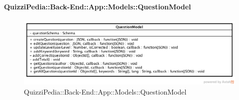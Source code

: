 \paragraph{QuizziPedia::Back-End::App::Models::QuestionModel}
\label{QuizziPedia::Back-End::App::Models::QuestionModel}
\begin{figure}[ht]
	\centering
	\includegraphics[scale=0.65]{UML/Classi/Back-End/QuizziPedia_Back-End_App_Models_questionModel.png}
	\caption{QuizziPedia::Back-End::App::Models::QuestionModel}
\end{figure}
\FloatBarrier
